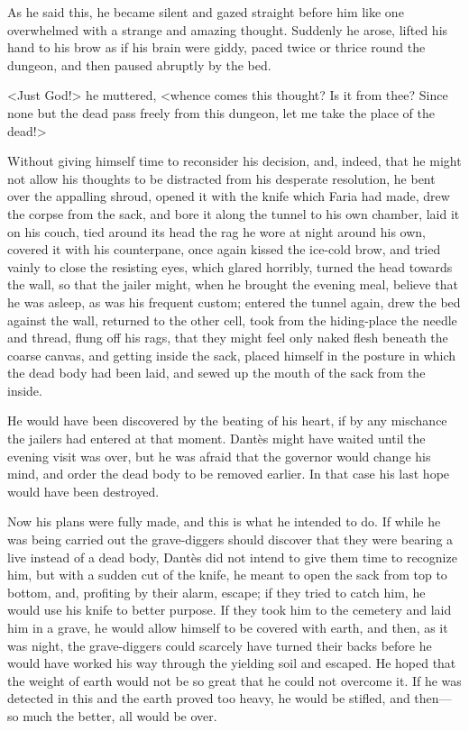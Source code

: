  As he said this, he became silent and gazed straight before him like one overwhelmed with a strange and amazing thought. Suddenly he arose, lifted his hand to his brow as if his brain were giddy, paced twice or thrice round the dungeon, and then paused abruptly by the bed. 

 <Just God!> he muttered, <whence comes this thought? Is it from thee? Since none but the dead pass freely from this dungeon, let me take the place of the dead!> 

 Without giving himself time to reconsider his decision, and, indeed, that he might not allow his thoughts to be distracted from his desperate resolution, he bent over the appalling shroud, opened it with the knife which Faria had made, drew the corpse from the sack, and bore it along the tunnel to his own chamber, laid it on his couch, tied around its head the rag he wore at night around his own, covered it with his counterpane, once again kissed the ice-cold brow, and tried vainly to close the resisting eyes, which glared horribly, turned the head towards the wall, so that the jailer might, when he brought the evening meal, believe that he was asleep, as was his frequent custom; entered the tunnel again, drew the bed against the wall, returned to the other cell, took from the hiding-place the needle and thread, flung off his rags, that they might feel only naked flesh beneath the coarse canvas, and getting inside the sack, placed himself in the posture in which the dead body had been laid, and sewed up the mouth of the sack from the inside. 

 He would have been discovered by the beating of his heart, if by any mischance the jailers had entered at that moment. Dantès might have waited until the evening visit was over, but he was afraid that the governor would change his mind, and order the dead body to be removed earlier. In that case his last hope would have been destroyed. 

 Now his plans were fully made, and this is what he intended to do. If while he was being carried out the grave-diggers should discover that they were bearing a live instead of a dead body, Dantès did not intend to give them time to recognize him, but with a sudden cut of the knife, he meant to open the sack from top to bottom, and, profiting by their alarm, escape; if they tried to catch him, he would use his knife to better purpose.  If they took him to the cemetery and laid him in a grave, he would allow himself to be covered with earth, and then, as it was night, the grave-diggers could scarcely have turned their backs before he would have worked his way through the yielding soil and escaped. He hoped that the weight of earth would not be so great that he could not overcome it. If he was detected in this and the earth proved too heavy, he would be stifled, and then—so much the better, all would be over. 

